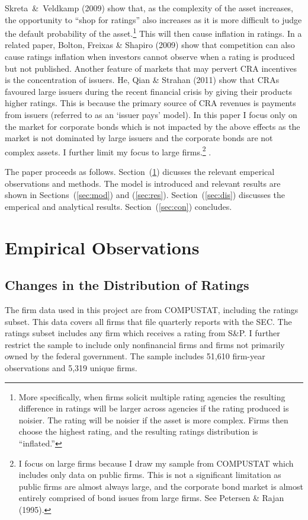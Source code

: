 \documentclass[titlepage]{article}
\begin{document}
Skreta~\&~Veldkamp (2009) show that, as the complexity of the asset increases, the opportunity to ``shop for ratings'' also increases as it is more difficult to judge the default probability of the asset.\footnote{More specifically, when firms solicit multiple rating agencies the resulting difference in ratings will be larger across agencies if the rating produced is noisier. The rating will be noisier if the asset is more complex. Firms then choose the highest rating, and the resulting ratings distribution is ``inflated.''} This will then cause inflation in ratings. In a related paper, Bolton, Freixas \& Shapiro (2009) show that competition can also cause ratings inflation when investors cannot observe when a rating is produced but not published. Another feature of markets that may pervert CRA incentives is the concentration of issuers. He, Qian \& Strahan (2011) show that CRAs favoured large issuers during the recent financial crisis by giving their products higher ratings. This is because the primary source of CRA revenues is payments from issuers (referred to as an `issuer pays' model). In this paper I focus only on the market for corporate bonds which is not impacted by the above effects as the market is not dominated by large issuers and the corporate bonds are not complex assets. I further limit my focus to large firms.\footnote{I focus on large firms because I draw my sample from COMPUSTAT which includes only data on public firms. This is not a significant limitation as public firms are almost always large, and the corporate bond market is almost entirely comprised of bond issues from large firms. See Petersen \& Rajan (1995).} .

The paper proceeds as follows. Section~(\ref{sec:emp}) dicusses the relevant emperical observations and methods. The model is introduced and relevant results are shown in Sections~(\ref{sec:mod}) and (\ref{sec:res}). Section~(\ref{sec:dis}) discusses the emperical and analytical results. Section~(\ref{sec:con}) concludes.

\section{Empirical Observations}
\label{sec:emp}
\subsection{Changes in the Distribution of Ratings}
The firm data used in this project are from COMPUSTAT, including the ratings subset. This data covers all firms that file quarterly reports with the SEC. The ratings subset includes any firm which receives a rating from S\&P. I further restrict the sample to include only nonfinancial firms and firms not primarily owned by the federal government. The sample includes 51,610 firm-year observations and 5,319 unique firms. 
\end{document}
